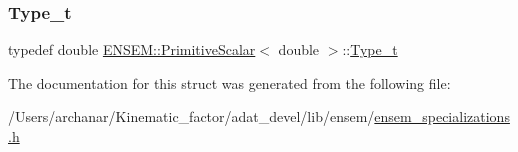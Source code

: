 \subsubsection{\texorpdfstring{Type\_t}{Type\_t}\hspace{0.1cm}{\footnotesize\ttfamily [2/2]}}
{\footnotesize\ttfamily typedef double \mbox{\hyperlink{structENSEM_1_1PrimitiveScalar}{E\+N\+S\+E\+M\+::\+Primitive\+Scalar}}$<$ double $>$\+::\mbox{\hyperlink{structENSEM_1_1PrimitiveScalar_3_01double_01_4_aa2e1f2e6e01268fb7f088e4f05c58a7f}{Type\+\_\+t}}}



The documentation for this struct was generated from the following file\+:\begin{DoxyCompactItemize}
\item 
/\+Users/archanar/\+Kinematic\+\_\+factor/adat\+\_\+devel/lib/ensem/\mbox{\hyperlink{lib_2ensem_2ensem__specializations_8h}{ensem\+\_\+specializations.\+h}}\end{DoxyCompactItemize}
